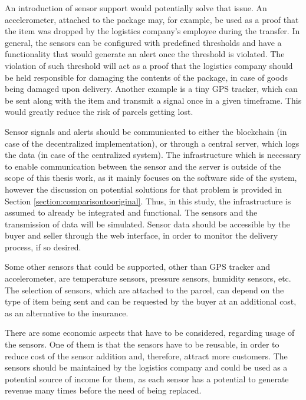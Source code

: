 An introduction of sensor support would potentially solve that issue. An accelerometer, attached to the package may, for example, be used as a proof that the item was dropped by the logistics company's employee during the transfer. In general, the sensors can be configured with predefined thresholds and have a functionality that would generate an alert once the threshold is violated. The violation of such threshold will act as a proof that the logistics company should be held responsible for damaging the contents of the package, in case of goods being damaged upon delivery. Another example is a tiny GPS tracker, which can be sent along with the item and transmit a signal once in a given timeframe. This would greatly reduce the risk of parcels getting lost.

Sensor signals and alerts should be communicated to either the blockchain (in case of the decentralized implementation), or through a central server, which logs the data (in case of the centralized system). The infrastructure which is necessary to enable communication between the sensor and the server is outside of the scope of this thesis work, as it mainly focuses on the software side of the system, however the discussion on potential solutions for that problem is provided in Section \ref{section:comparisontooriginal}. Thus, in this study, the infrastructure is assumed to already be integrated and functional. The sensors and the transmission of data will be simulated. Sensor data should be accessible by the buyer and seller through the web interface, in order to monitor the delivery process, if so desired.

Some other sensors that could be supported, other than GPS tracker and accelerometer, are temperature sensors, pressure sensors, humidity sensors, etc. The selection of sensors, which are attached to the parcel, can depend on the type of item being sent and can be requested by the buyer at an additional cost, as an alternative to the insurance.

There are some economic aspects that have to be considered, regarding usage of the sensors. One of them is that the sensors have to be reusable, in order to reduce cost of the sensor addition and, therefore, attract more customers. The sensors should be maintained by the logistics company and could be used as a potential source of income for them, as each sensor has a potential to generate revenue many times before the need of being replaced.